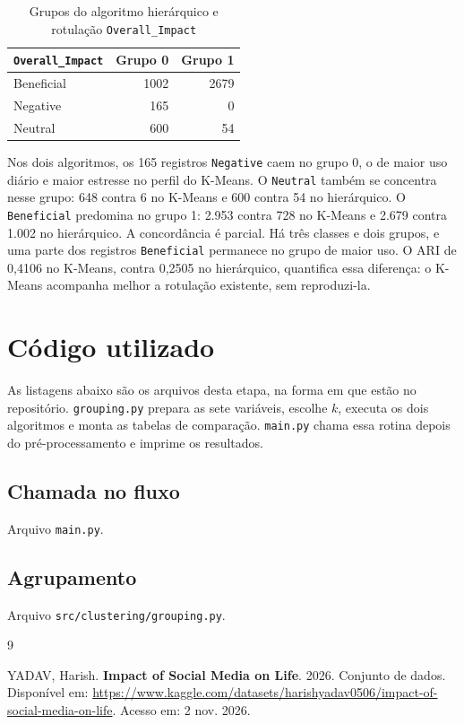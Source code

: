 \documentclass[
  article,
  12pt,
  oneside,
  a4paper,
  english,
  brazil,
  chapter=TITLE,
  section=TITLE,
  subsection=TITLE
]{abntex2}
\begin{document}
\begin{table}[htb]
  \centering
  \caption{Grupos do algoritmo hierárquico e rotulação \texttt{Overall\_Impact}}
  \label{tab:hi}
  \begin{tabular}{lrr}
    \toprule
    \texttt{Overall\_Impact} & Grupo 0 & Grupo 1 \\
    \midrule
    Beneficial & 1002 & 2679 \\
    Negative & 165 & 0 \\
    Neutral & 600 & 54 \\
    \bottomrule
  \end{tabular}
\end{table}

\FloatBarrier

Nos dois algoritmos, os 165 registros \texttt{Negative} caem no grupo 0, o de maior uso diário e maior estresse no perfil do K-Means. O \texttt{Neutral} também se concentra nesse grupo: 648 contra 6 no K-Means e 600 contra 54 no hierárquico. O \texttt{Beneficial} predomina no grupo 1: 2.953 contra 728 no K-Means e 2.679 contra 1.002 no hierárquico. A concordância é parcial. Há três classes e dois grupos, e uma parte dos registros \texttt{Beneficial} permanece no grupo de maior uso. O ARI de 0,4106 no K-Means, contra 0,2505 no hierárquico, quantifica essa diferença: o K-Means acompanha melhor a rotulação existente, sem reproduzi-la.

\section{Código utilizado}

As listagens abaixo são os arquivos desta etapa, na forma em que estão no repositório. \texttt{grouping.py} prepara as sete variáveis, escolhe \(k\), executa os dois algoritmos e monta as tabelas de comparação. \texttt{main.py} chama essa rotina depois do pré-processamento e imprime os resultados.

\subsection{Chamada no fluxo}

Arquivo \texttt{main.py}.



\subsection{Agrupamento}

Arquivo \texttt{src/clustering/}\allowbreak\texttt{grouping.py}.



\postextual

\begin{thebibliography}{9}

YADAV, Harish. \textbf{Impact of Social Media on Life}. 2026. Conjunto de dados. Disponível em: \url{https://www.kaggle.com/datasets/harishyadav0506/impact-of-social-media-on-life}. Acesso em: 2 nov. 2026.

\end{thebibliography}
\end{document}
